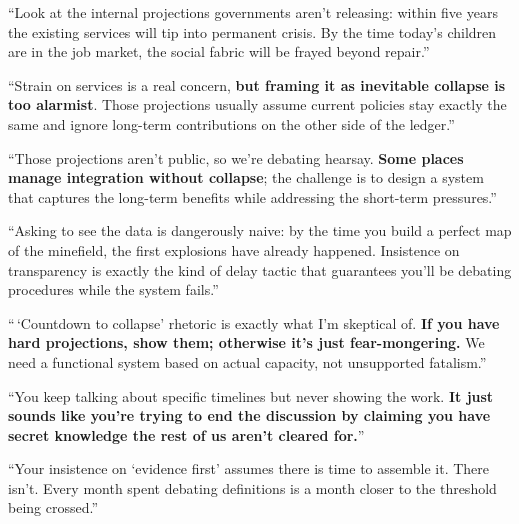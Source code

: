 \begin{casebox}



\textcolor{malRed}{``Look at the internal projections governments aren't releasing: within five years the existing services will tip into permanent crisis. By the time today's children are in the job market, the social fabric will be frayed beyond repair.''}

``Strain on services is a real concern, \textbf{but framing it as inevitable collapse is too alarmist}. Those projections usually assume current policies stay exactly the same and ignore long-term contributions on the other side of the ledger.''

``Those projections aren't public, so we're debating hearsay. \textbf{Some places manage integration without collapse}; the challenge is to design a system that captures the long-term benefits while addressing the short-term pressures.''


\textcolor{malRed}{``Asking to see the data is dangerously naive: by the time you build a perfect map of the minefield, the first explosions have already happened. Insistence on transparency is exactly the kind of delay tactic that guarantees you'll be debating procedures while the system fails.''}

``\,`Countdown to collapse' rhetoric is exactly what I'm skeptical of. \textbf{If you have hard projections, show them; otherwise it's just fear-mongering.} We need a functional system based on actual capacity, not unsupported fatalism.''

``You keep talking about specific timelines but never showing the work. \textbf{It just sounds like you're trying to end the discussion by claiming you have secret knowledge the rest of us aren't cleared for.}''


\textcolor{malRed}{``Your insistence on `evidence first' assumes there is time to assemble it. There isn't. Every month spent debating definitions is a month closer to the threshold being crossed.''}


\end{casebox}
